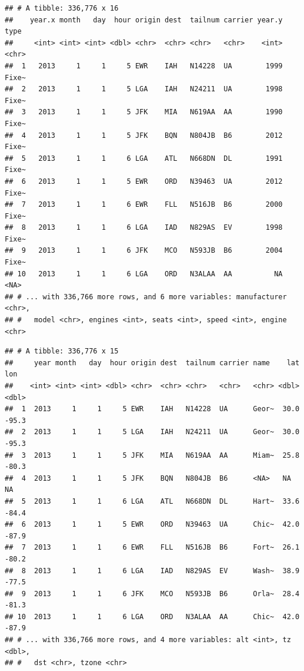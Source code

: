\documentclass[]{book}
\newenvironment{Shaded}{\begin{snugshade}}{\end{snugshade}}
\newcommand{\KeywordTok}[1]{\textcolor[rgb]{0.13,0.29,0.53}{\textbf{#1}}}
\newcommand{\DataTypeTok}[1]{\textcolor[rgb]{0.13,0.29,0.53}{#1}}
\newcommand{\StringTok}[1]{\textcolor[rgb]{0.31,0.60,0.02}{#1}}
\newcommand{\CommentTok}[1]{\textcolor[rgb]{0.56,0.35,0.01}{\textit{#1}}}
\newcommand{\OperatorTok}[1]{\textcolor[rgb]{0.81,0.36,0.00}{\textbf{#1}}}
\newcommand{\NormalTok}[1]{#1}
\theoremstyle{definition}
\theoremstyle{definition}
\theoremstyle{definition}
\theoremstyle{remark}
\begin{document}
\begin{verbatim}
## # A tibble: 336,776 x 16
##    year.x month   day  hour origin dest  tailnum carrier year.y type 
##     <int> <int> <int> <dbl> <chr>  <chr> <chr>   <chr>    <int> <chr>
##  1   2013     1     1     5 EWR    IAH   N14228  UA        1999 Fixe~
##  2   2013     1     1     5 LGA    IAH   N24211  UA        1998 Fixe~
##  3   2013     1     1     5 JFK    MIA   N619AA  AA        1990 Fixe~
##  4   2013     1     1     5 JFK    BQN   N804JB  B6        2012 Fixe~
##  5   2013     1     1     6 LGA    ATL   N668DN  DL        1991 Fixe~
##  6   2013     1     1     5 EWR    ORD   N39463  UA        2012 Fixe~
##  7   2013     1     1     6 EWR    FLL   N516JB  B6        2000 Fixe~
##  8   2013     1     1     6 LGA    IAD   N829AS  EV        1998 Fixe~
##  9   2013     1     1     6 JFK    MCO   N593JB  B6        2004 Fixe~
## 10   2013     1     1     6 LGA    ORD   N3ALAA  AA          NA <NA> 
## # ... with 336,766 more rows, and 6 more variables: manufacturer <chr>,
## #   model <chr>, engines <int>, seats <int>, speed <int>, engine <chr>
\end{verbatim}

\begin{Shaded}
\end{Shaded}

\begin{verbatim}
## # A tibble: 336,776 x 15
##     year month   day  hour origin dest  tailnum carrier name    lat   lon
##    <int> <int> <int> <dbl> <chr>  <chr> <chr>   <chr>   <chr> <dbl> <dbl>
##  1  2013     1     1     5 EWR    IAH   N14228  UA      Geor~  30.0 -95.3
##  2  2013     1     1     5 LGA    IAH   N24211  UA      Geor~  30.0 -95.3
##  3  2013     1     1     5 JFK    MIA   N619AA  AA      Miam~  25.8 -80.3
##  4  2013     1     1     5 JFK    BQN   N804JB  B6      <NA>   NA    NA  
##  5  2013     1     1     6 LGA    ATL   N668DN  DL      Hart~  33.6 -84.4
##  6  2013     1     1     5 EWR    ORD   N39463  UA      Chic~  42.0 -87.9
##  7  2013     1     1     6 EWR    FLL   N516JB  B6      Fort~  26.1 -80.2
##  8  2013     1     1     6 LGA    IAD   N829AS  EV      Wash~  38.9 -77.5
##  9  2013     1     1     6 JFK    MCO   N593JB  B6      Orla~  28.4 -81.3
## 10  2013     1     1     6 LGA    ORD   N3ALAA  AA      Chic~  42.0 -87.9
## # ... with 336,766 more rows, and 4 more variables: alt <int>, tz <dbl>,
## #   dst <chr>, tzone <chr>
\end{verbatim}
\end{document}
